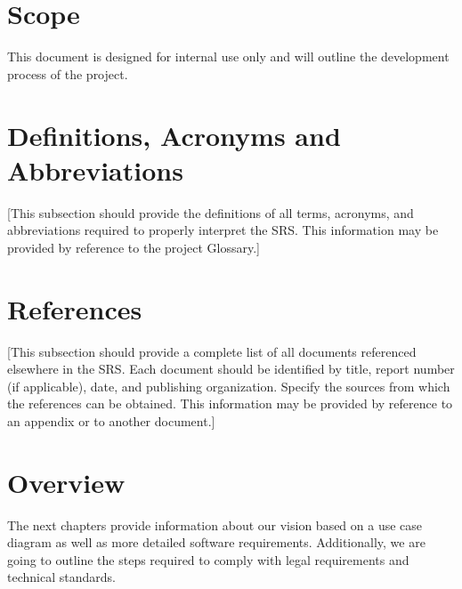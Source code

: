 \documentclass[a4paper,12pt,chapterprefix=false,bibliography=totoc,listof=totoc,]{scrreprt}
\begin{document}
\section{Scope}
This document is designed for internal use only and will outline the development process of the project.

\section{Definitions, Acronyms and Abbreviations}
{\color{blue} [This subsection should provide the definitions of all terms, acronyms, and abbreviations required to properly interpret the SRS.  This information may be provided by reference to the project Glossary.]}

\section{References}
{\color{blue} [This subsection should provide a complete list of all documents referenced elsewhere in the SRS.  Each document should be identified by title, report number (if applicable), date, and publishing organization.  Specify the sources from which the references can be obtained. This information may be provided by reference to an appendix or to another document.]}

\section{Overview}
The next chapters provide information about our vision based on a use case diagram as well as more detailed software requirements. Additionally, we are going to outline the steps required to comply with legal requirements and technical standards.
\end{document}
